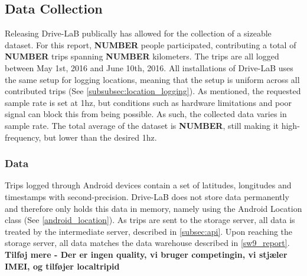 \subsection{Data Collection}\label{sec:datacollection}
Releasing Drive-LaB publically has allowed for the collection of a sizeable dataset. For this report, \textbf{NUMBER} people participated, contributing a total of \textbf{NUMBER} trips spanning \textbf{NUMBER} kilometers. The trips are all logged between May 1st, 2016 and June 10th, 2016. All installations of Drive-LaB uses the same setup for logging locations, meaning that the setup is uniform across all contributed trips (See \ref{subsubsec:location_logging}). As mentioned, the requested sample rate is set at 1hz, but conditions such as hardware limitations and poor signal can block this from being possible. As such, the collected data varies in sample rate. The total average of the dataset is \textbf{NUMBER}, still making it high-frequency, but lower than the desired 1hz.

\subsubsection{Data}\label{subsec:data}
Trips logged through Android devices contain a set of latitudes, longitudes and timestamps with second-precision. Drive-LaB does not store data permanently and therefore only holds this data in memory, namely using the Android Location class (See \ref{android_location}). As trips are sent to the storage server, all data is treated by the intermediate server, described in \ref{subsec:api}. Upon reaching the storage server, all data matches the data warehouse described in \ref{sw9_report}. \textbf{Tilføj mere - Der er ingen quality, vi bruger competingin, vi stjæler IMEI, og tilføjer localtripid} 
